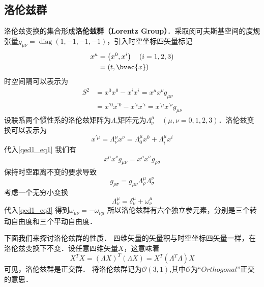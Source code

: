 \subsection{洛伦兹群}
洛伦兹变换的集合形成\textbf{洛伦兹群（Lorentz Group）}．采取闵可夫斯基空间的度规张量$g_{\mu \nu}=\operatorname{diag}(1,-1,-1,-1)$，引入时空坐标四矢量标记
\begin{equation}
\begin{aligned}
x^{\mu} &=\left(x^{0}, x^{i}\right) \quad(i=1,2,3)\\
&=(t, \bvec{x})
\end{aligned}
\end{equation}
时空间隔可以表示为
\begin{equation}\label{qed1_eq1}\begin{aligned}
S^{2} &=x^{0} x^{0}-x^{i} x^{i}=x^{\mu} x^{\nu} g_{\mu \nu} \\
&=x^{\prime 0} x^{\prime 0}-x^{\prime i} x^{\prime i}=x^{\prime \mu} x^{\prime \nu} g_{\mu \nu}
\end{aligned}\end{equation}
设联系两个惯性系的洛伦兹矩阵为$\Lambda$,矩阵元为$\Lambda_{\nu}^{\mu}\quad(\mu,\nu=0,1,2,3)$．洛伦兹变换可以表示为
\begin{equation}\label{qed1_eq2}x^{\prime \mu}=\Lambda_{\nu}^{\mu} x^{\nu}=\Lambda_{0}^{\mu} x^{0}+\Lambda_{i}^{\mu} x^{i}\end{equation}
代入\autoref{qed1_eq1} 我们有
\begin{align}
x^{\mu} x^{\nu} g_{\mu \nu}=x^{\rho} x^{\sigma} g_{\rho \sigma}
\end{align}
保持时空距离不变的要求导致
\begin{equation}\label{qed1_eq3}g_{\rho \sigma}=g_{\mu \nu} \Lambda_{\rho}^{\mu} \Lambda_{\sigma}^{\nu}\end{equation}
考虑一个无穷小变换
\begin{equation}\Lambda_{\nu}^{\mu}=\delta_{\nu}^{\mu}+\omega_{\nu}^{\mu}\end{equation}
代入\autoref{qed1_eq3} 得到$\omega_{\mu \nu}=-\omega_{\nu \mu}$
所以洛伦兹群有六个独立参元素，分别是三个转动自由度和三个平动自由度．

下面我们来探讨洛伦兹群的性质．
四维矢量的矢量积与时空坐标四矢量一样，在洛伦兹变换下不变．设任意四维矢量$X$，这意味着
\begin{equation}
X^TX=(\Lambda X)^T(\Lambda X)=X^T(\Lambda^T\Lambda)X
\end{equation}
可见，洛伦兹群是正交群．
将洛伦兹群记为$\mathcal{O}(3,1)$,其中$\mathcal{O}$为“$Orthogonal$”正交的意思．
